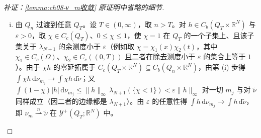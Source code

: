\documentclass[../../main.tex]{subfiles}%
\begin{document}
\begin{proof}[补证：\cref{lemma:ch08-ν_m收敛} 原证明中省略的细节]
\begin{enumerate}[(i)]
\begin{align*}
\tilde\nu(E\times\mathbb{R}^N)=\lim_{n\to\infty}\lambda_{N+1}(E\cap Q_n)=\lambda_{N+1}(E),
\end{align*}
即 $\tilde\nu$ 在 $Q_\infty$ 上的边缘为 $\lambda_{N+1}$；又每个 $\nu^{(n)}$ 的离散分解几乎处处取值于概率测度，故 $\tilde\nu$ 的离散分解亦然（逐层取 $n$ 充分大并对零测集取并）。于是 $\tilde\nu\in\mathcal{Y}^+(Q_\infty;\mathbb{R}^N)$。
\item 由 $Q_n$ 过渡到任意 $Q_T$。设 $T\in(0,\infty)$，取 $n>T$。对 $h\in C_b(Q_T\times\mathbb{R}^N)$ 与 $\varepsilon>0$，取 $\chi\in C_c(Q_T)$、$0\leqslant\chi\leqslant1$，使 $\chi=1$ 在 $Q_T$ 的一个子集上、且该子集关于 $\lambda_{N+1}$ 的余测度小于 $\varepsilon$（例如取 $\chi=\chi_1(x)\chi_2(t)$，其中 $\chi_1\in C_c(\Omega)$、$\chi_2\in C_c((0,T))$ 且二者在除去测度小于 $\varepsilon$ 的集合上等于 $1$）。由于 $\chi h$ 的零延拓属于 $C_c(Q_T\times\mathbb{R}^N)\subseteq C_b(Q_n\times\mathbb{R}^N)$，由第 (i) 步得 $\int\chi h\,\mathrm{d}\nu_{m_j}\to\int\chi h\,\mathrm{d}\tilde\nu$；又 $\int(1-\chi)|h|\,\mathrm{d}\nu_{m_j}\leqslant\|h\|_\infty\,\lambda_{N+1}(\{\chi<1\})<\varepsilon\|h\|_\infty$ 对一切 $m_j$ 与对 $\tilde\nu$ 同样成立（因二者的边缘都是 $\lambda_{N+1}$）。由 $\varepsilon$ 的任意性得 $\int h\,\mathrm{d}\nu_{m_j}\to\int h\,\mathrm{d}\tilde\nu$，即 $\nu_m\stackrel{n}{\rightharpoonup}\tilde\nu$ 在 $\mathcal{Y}^+(Q_T;\mathbb{R}^N)$ 中。
\end{enumerate}
\end{proof}
\end{document}
